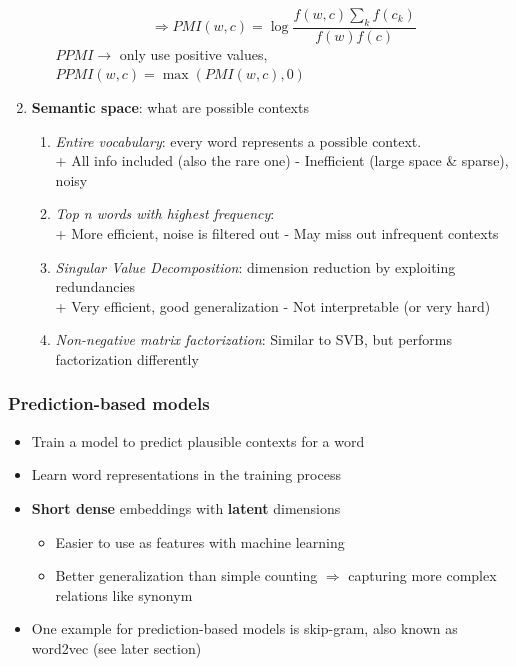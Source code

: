 \begin{enumerate}
\begin{enumerate}
		$$\Rightarrow PMI(w,c) = \log \frac{f(w,c)\sum_k f(c_k)}{f(w)f(c)}$$
		$PPMI\to$ only use positive values, $PPMI(w,c) =\max\left(PMI(w,c),0\right)$
	\end{enumerate}
	\item \textbf{Semantic space}: what are possible contexts
	\begin{enumerate}
		\item \textit{Entire vocabulary}: every word represents a possible context.\\
		+ All info included (also the rare one) - Inefficient (large space \& sparse), noisy
		\item \textit{Top n words with highest frequency}: \\
		+ More efficient, noise is filtered out - May miss out infrequent contexts
		\item \textit{Singular Value Decomposition}: dimension reduction by exploiting redundancies\\
		+ Very efficient, good generalization - Not interpretable (or very hard)
		\item \textit{Non-negative matrix factorization}: Similar to SVB, but performs factorization differently
	\end{enumerate}
\end{enumerate}
\subsubsection{Prediction-based models}
\begin{itemize}
	\item Train a model to predict plausible contexts for a word
	\item Learn word representations in the training process
	\item \textbf{Short dense} embeddings with \textbf{latent} dimensions 
	\begin{itemize}
		\item Easier to use as features with machine learning
		\item Better generalization than simple counting $\Rightarrow$ capturing more complex relations like synonym
	\end{itemize}
	\item One example for prediction-based models is skip-gram, also known as word2vec (see later section)
\end{itemize}
